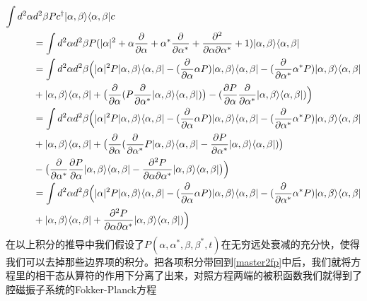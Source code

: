 \begin{equation}
\begin{aligned}
\int d^{2}\alpha & d^{2}\beta Pc^{\dag}|\alpha,\beta\rangle \langle \alpha,\beta|c \\
&= \int d^{2}\alpha d^{2}\beta P(|\alpha|^{2}+\alpha\frac{\partial}{\partial\alpha}+\alpha^{*}\frac{\partial}{\partial\alpha^{*}}+\frac{\partial^{2}}{\partial\alpha\partial\alpha^{*}}+1)|\alpha,\beta\rangle \langle \alpha,\beta| \\
&= \int d^{2}\alpha d^{2}\beta \Bigl(|\alpha|^{2}P|\alpha,\beta\rangle \langle \alpha,\beta|-(\frac{\partial}{\partial\alpha}\alpha P)|\alpha,\beta\rangle \langle \alpha,\beta|-(\frac{\partial}{\partial\alpha^{*}}\alpha^{*} P)|\alpha,\beta\rangle \langle \alpha,\beta| \\
&+|\alpha,\beta\rangle \langle \alpha,\beta|+\bigl(\frac{\partial}{\partial\alpha}(P\frac{\partial}{\partial\alpha^{*}}|\alpha,\beta\rangle \langle \alpha,\beta|)\bigr)-(\frac{\partial P}{\partial\alpha}\frac{\partial}{\partial\alpha^{*}}|\alpha,\beta\rangle \langle \alpha,\beta|)\Bigr) \\
&= \int d^{2}\alpha d^{2}\beta \Bigl(|\alpha|^{2}P|\alpha,\beta\rangle \langle \alpha,\beta|-(\frac{\partial}{\partial\alpha}\alpha P)|\alpha,\beta\rangle \langle \alpha,\beta|-(\frac{\partial}{\partial\alpha^{*}}\alpha^{*} P)|\alpha,\beta\rangle \langle \alpha,\beta| \\
&+|\alpha,\beta\rangle \langle \alpha,\beta|+\bigl(\frac{\partial}{\partial\alpha}(\frac{\partial}{\partial\alpha^{*}}P|\alpha,\beta\rangle \langle \alpha,\beta|-\frac{\partial P}{\partial\alpha^{*}}|\alpha,\beta\rangle \langle \alpha,\beta|)\bigr) \\
&-\bigl(\frac{\partial}{\partial\alpha^{*}}\frac{\partial P}{\partial\alpha}|\alpha,\beta\rangle \langle \alpha,\beta|-\frac{\partial^{2}P}{\partial\alpha\partial\alpha^{*}}|\alpha,\beta\rangle \langle \alpha,\beta|\bigr)\Bigr) \\
&= \int d^{2}\alpha d^{2}\beta \Bigl(|\alpha|^{2}P|\alpha,\beta\rangle \langle \alpha,\beta|-(\frac{\partial}{\partial\alpha}\alpha P)|\alpha,\beta\rangle \langle \alpha,\beta|-(\frac{\partial}{\partial\alpha^{*}}\alpha^{*} P)|\alpha,\beta\rangle \langle \alpha,\beta| \\
&+|\alpha,\beta\rangle \langle \alpha,\beta|+\frac{\partial^{2}P}{\partial\alpha\partial\alpha^{*}}|\alpha,\beta\rangle \langle \alpha,\beta|)\Bigr)
\end{aligned}
\end{equation}
在以上积分的推导中我们假设了$P(\alpha,\alpha^{*},\beta,\beta^{*},t)$在无穷远处衰减的充分快，使得我们可以去掉那些边界项的积分。把各项积分带回到\eqref{master2fp}中后，我们就将方程里的相干态从算符的作用下分离了出来，对照方程两端的被积函数我们就得到了腔磁振子系统的Fokker-Planck方程

